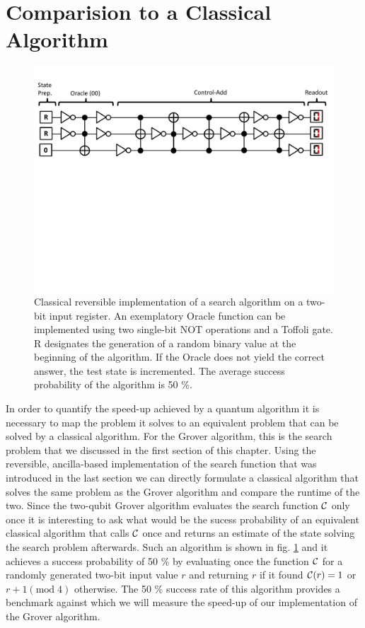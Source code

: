 \section{Comparision to a Classical Algorithm}

\begin{figure}[ht!]
	\centering
		\includegraphics[width=1.0\textwidth]{"./material/papers/grover/classical_reversible_algorithm"}
	\caption{Classical reversible implementation of a search algorithm on a two-bit input register. An exemplatory Oracle function can be implemented using two single-bit NOT operations and a Toffoli gate. R designates the generation of a random binary value at the beginning of the algorithm. If the Oracle does not yield the correct answer, the test state is incremented. The average success probability of the algorithm is 50 \%.}
	\label{fig:GroverClassicalReversibleAlgorithm}
\end{figure}

In order to quantify the speed-up achieved by a quantum algorithm it is necessary to map the problem it solves to an equivalent problem that can be solved by a classical algorithm. For the Grover algorithm, this is the search problem that we discussed in the first section of this chapter. Using the reversible, ancilla-based implementation of the search function that was introduced in the last section we can directly formulate a classical algorithm that solves the same problem as the Grover algorithm and compare the runtime of the two. Since the two-qubit Grover algorithm evaluates the search function $\Or$ only once it is interesting to ask what would be the sucess probability of an equivalent classical algorithm that calls $\Or$ once and returns an estimate of the state solving the search problem afterwards. Such an algorithm is shown in fig. \ref{fig:GroverClassicalReversibleAlgorithm} and it achieves a success probability of 50 \% by evaluating once the function $\Or$ for a randomly generated two-bit input value $r$ and returning $r$ if it found $\Or(r)=1$ or $r+1(\mathrm{mod}\;4)$ otherwise. The 50 \% success rate of this algorithm provides a benchmark against which we will measure the speed-up of our implementation of the Grover algorithm.

